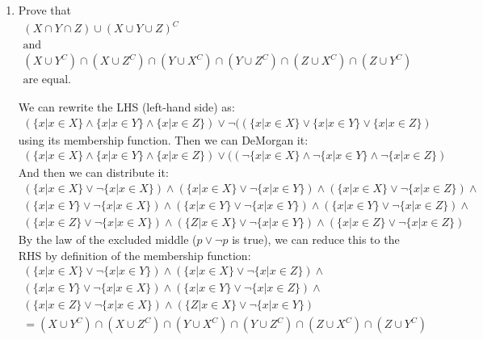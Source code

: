\documentclass{article}
\begin{document}
\begin{enumerate}
    \item Prove that
    \begin{gather*}
            (X \cap Y \cap Z) \cup (X \cup Y \cup Z)^C \\
            \text{and} \\
            (X \cup Y^C) \cap (X \cup Z^C) \cap (Y \cup X^C) \cap (Y \cup Z^C) \cap (Z \cup X^C) \cap (Z \cup Y^C) \\
            \text{are equal.}
    \end{gather*}
            \begin{mdframed}
            We can rewrite the LHS (left-hand side) as: \\
            \begin{gather*}
            (\{ x | x \in X \} \wedge \{ x | x \in Y \} \wedge \{ x | x \in Z \}) \vee \neg ((\{ x | x \in X \} \vee \{ x | x \in Y \} \vee \{ x | x \in Z \})
            \end{gather*} using its membership function.
            Then we can DeMorgan it:
            \begin{gather*}
                (\{ x | x \in X \} \wedge \{ x | x \in Y \} \wedge \{ x | x \in Z \}) \vee ((\neg\{ x | x \in X \} \wedge \neg\{ x | x \in Y \} \wedge \neg\{ x | x \in Z \})
            \end{gather*}
            And then we can distribute it:
            \begin{gather*}
                (\{ x | x \in X \} \vee \neg\{ x | x \in X \}) \wedge (\{ x | x \in X \} \vee \neg\{ x | x \in Y \}) \wedge (\{ x | x \in X \} \vee \neg\{ x | x \in Z \}) \wedge \\
                (\{ x | x \in Y \} \vee \neg\{ x | x \in X \}) \wedge (\{ x | x \in Y \} \vee \neg\{ x | x \in Y \}) \wedge (\{ x | x \in Y \} \vee \neg\{ x | x \in Z \}) \wedge \\
                (\{ x | x \in Z \} \vee \neg\{ x | x \in X \}) \wedge (\{ Z | x \in X \} \vee \neg\{ x | x \in Y \}) \wedge (\{ x | x \in Z \} \vee \neg\{ x | x \in Z \})
            \end{gather*}
            By the law of the excluded middle ($p \vee \neg p$ is true), we can reduce this to the RHS by definition of the membership function:
            \begin{gather*}
                (\{ x | x \in X \} \vee \neg\{ x | x \in Y \}) \wedge (\{ x | x \in X \} \vee \neg\{ x | x \in Z \}) \wedge \\
                (\{ x | x \in Y \} \vee \neg\{ x | x \in X \}) \wedge (\{ x | x \in Y \} \vee \neg\{ x | x \in Z \}) \wedge \\
                (\{ x | x \in Z \} \vee \neg\{ x | x \in X \}) \wedge (\{ Z | x \in X \} \vee \neg\{ x | x \in Y \}) \\
                = (X \cup Y^C) \cap (X \cup Z^C) \cap (Y \cup X^C) \cap (Y \cup Z^C) \cap (Z \cup X^C) \cap (Z \cup Y^C)
            \end{gather*}
            \end{mdframed}

\end{enumerate}
\end{document}
